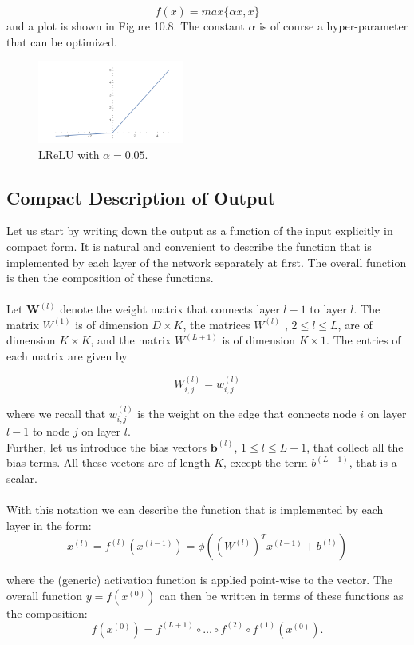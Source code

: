 \documentclass[twoside]{article}
\begin{document}
$$f(x) = max\{ \alpha x, x\}$$
and a plot is shown in Figure 10.8. The constant $\alpha$ is of course
a hyper-parameter that can be optimized.

\begin{figure}[h]
\centering
\includegraphics[width=0.43\textwidth]{img/lrelu.png}
\caption{LReLU with $\alpha = 0.05$.}
\end{figure}

\newpage

\subsection{Compact Description of Output}
Let us start by writing down the output as a function of the input explicitly in compact form. It is natural and convenient to describe the function that is implemented by each layer of the network separately at first. The overall function is then
the composition of these functions. \\ \\
Let $\mathbf{W}^{(l)}$ denote the weight matrix that connects layer $l  - 1$
to layer $l$. The matrix $W^{(1)}$ is of dimension $D \times K$, the
matrices $W^{(l)}$
, $2 \leq l \leq L$, are of dimension $K \times K$, and the
matrix $W^{(L+1)}$ is of dimension $K \times 1$. The entries of each
matrix are given by

$$W^{(l)}_{i,j} = w^{(l)}_{i,j} $$

where we recall that $ w^{(l)}_{i,j}$ is the weight on the edge that connects node $i$ on layer $l - 1$ to node $j$ on layer $l$.\\ 
Further, let us introduce the bias vectors 
$\mathbf{b}^{(l)}$, $1 \leq l \leq L+1$,
that collect all the bias terms. All these vectors are of length
$K$, except the term $b^{(L+1)}$, that is a scalar. \\ \\
With this notation we can describe the function that is implemented by each layer in the form: 
$$x^{(l)} = f^{(l)}(x^{(l-1)}) = \phi((W^{(l)})^T  x^{(l-1)} + b^{(l)})$$

where the (generic) activation function is applied point-wise to the vector.
The overall function $y = f(x
^{(0)})$ can then be written in terms
of these functions as the composition:
$$f(x^{(0)}) = f^{(L+1)} \circ \ldots \circ f^{(2)} \circ f^{(1)}(x^{(0)}).$$
\end{document}
